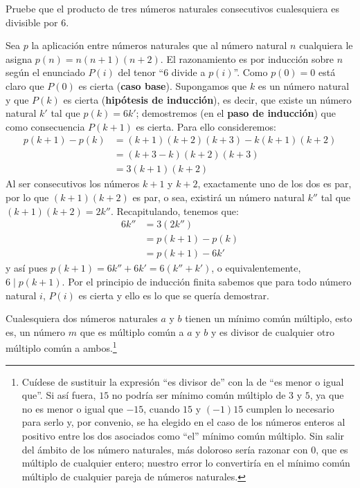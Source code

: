 \begin{exercise}
  Pruebe que el producto de tres números naturales consecutivos
  cualesquiera es divisible por $6$.
\end{exercise}

\begin{solution}
  Sea $p$ la aplicación entre números naturales que al número natural
  $n$ cualquiera le asigna $p(n)=n(n+1)(n+2)$. El razonamiento es por
  inducción sobre $n$ según el enunciado $P(i)$ del tenor ``$6$ divide
  a $p(i)$''. Como $p(0)=0$ está claro que $P(0)$ es cierta
  (\textbf{caso base}). Supongamos que $k$ es un número natural y que
  $P(k)$ es cierta (\textbf{hipótesis de inducción}), es decir, que
  existe un número natural $k'$ tal que $p(k)=6k'$; demostremos (en
  el \textbf{paso de inducción}) que como consecuencia $P(k+1)$ es
  cierta. Para ello consideremos:
  \begin{align*}
    p(k+1)-p(k)&=(k+1)(k+2)(k+3)-k(k+1)(k+2)\\
               &=(k+3-k)(k+2)(k+3)\\
               &=3(k+1)(k+2)
  \end{align*}
  Al ser consecutivos los números $k+1$ y $k+2$, exactamente uno de
  los dos es par, por lo que $(k+1)(k+2)$ es par, o sea, existirá un
  número natural $k''$ tal que $(k+1)(k+2)=2k''$. Recapitulando,
  tenemos que:
  \begin{align*}
    6k''&=3(2k'')\\
        &=p(k+1)-p(k)\\ 
        &=p(k+1)-6k'
  \end{align*}
  y así pues $p(k+1)=6k''+6k'=6(k''+k')$, o equivalentemente,
  $6\mid p(k+1)$. Por el principio de inducción finita sabemos que
  para todo número natural $i$, $P(i)$ es cierta y ello es lo que se
  quería demostrar.
\end{solution}

\begin{exercise}
  \label{ex:mcm}
  Cualesquiera dos números naturales $a$ y $b$ tienen un mínimo común
  múltiplo, esto es, un número $m$ que es múltiplo común a $a$ y $b$ y
  es divisor de cualquier otro múltiplo común a
  ambos.\footnote{Cuídese de sustituir la expresión ``es divisor de''
    con la de ``es menor o igual que''. Si así fuera, $15$ no podría
    ser mínimo común múltiplo de $3$ y $5$, ya que no es menor o igual
    que $-15$, cuando $15$ y $(-1)15$ cumplen lo necesario para serlo
    y, por convenio, se ha elegido en el caso de los números enteros
    al positivo entre los dos asociados como ``el'' mínimo común
    múltiplo. Sin salir del ámbito de los número naturales, más
    doloroso sería razonar con $0$, que es múltiplo de cualquier
    entero; nuestro error lo convertiría en el mínimo común múltiplo
    de cualquier pareja de números naturales.}
\end{exercise}

